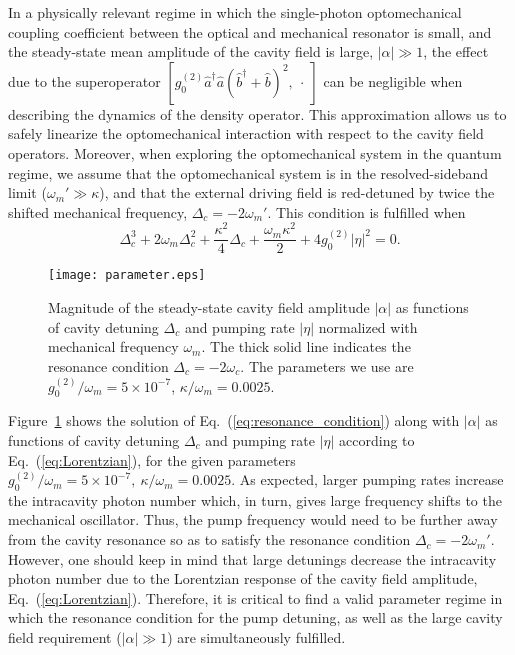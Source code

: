 \documentclass[pra,aps,showpacs,twocolumn,floatfix, superscriptaddress, nofootinbib, nobibnotes]{revtex4-1}
\begin{document}
In a physically relevant regime in which the single-photon optomechanical coupling coefficient between the optical and mechanical resonator is small, and the steady-state mean amplitude of the cavity field is large, $|\alpha|\gg1$, the effect due to the superoperator $[g_0^{(2)}\hat a^\dag\hat a(\hat b^{\dag}+\hat b)^2,~\cdot~]$ can be negligible when describing the dynamics of the density operator. This approximation allows us to safely linearize the optomechanical interaction with respect to the cavity field operators. Moreover, when exploring the optomechanical system in the quantum regime, we assume that the optomechanical system is in the resolved-sideband limit ($\omega_m'\gg \kappa$), and that the external driving field is red-detuned by twice the shifted mechanical frequency, $\Delta_c=-2\omega_m'$. This condition is fulfilled when
\begin{equation}
\Delta_c^3+2\omega_m\Delta_c^2+\frac{\kappa^2}{4}\Delta_c+\frac{\omega_m\kappa^2}{2}+4g_0^{(2)}|\eta|^2=0. 
\label{eq:resonance_condition}
\end{equation}

\begin{figure}[]
\texttt{[image: parameter.eps]}
\caption{Magnitude of the steady-state cavity field amplitude $|\alpha|$ as functions of cavity detuning $\Delta_c$ and pumping rate $|\eta|$ normalized with mechanical frequency $\omega_m$. The thick solid line indicates the resonance condition $\Delta_c=-2\omega_c$. The parameters we use are $g_0^{(2)}/\omega_m=5\times10^{-7}$, $\kappa/\omega_m=0.0025$. }
\label{fig:parameter}
\end{figure}

Figure~\ref{fig:parameter} shows the solution of Eq.~(\ref{eq:resonance_condition}) along with $|\alpha|$ as functions of cavity detuning $\Delta_c$ and pumping rate $|\eta|$ according to Eq.~(\ref{eq:Lorentzian}), for the given parameters $g_0^{(2)}/\omega_m = 5\times 10^{-7},~\kappa/\omega_m = 0.0025$. As expected, larger pumping rates increase the intracavity photon number which, in turn, gives large frequency shifts to the mechanical oscillator. Thus, the pump frequency would need to be further away from the cavity resonance so as to satisfy the resonance condition $\Delta_c=-2\omega_m'$. However, one should keep in mind that large detunings decrease the intracavity photon number due to the Lorentzian response of the cavity field amplitude, Eq.~(\ref{eq:Lorentzian}). Therefore, it is critical to find a valid parameter regime in which the resonance condition for the pump detuning, as well as the large cavity field requirement ($|\alpha|\gg1$) are simultaneously fulfilled.
\end{document}
